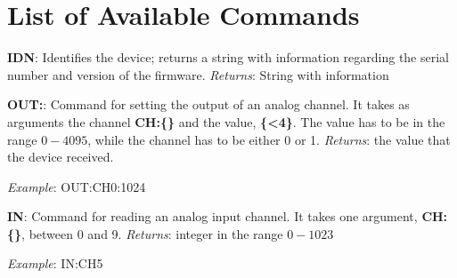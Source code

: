 \section{List of Available Commands}\label{sec:list-of-commandsavailable}
\textbf{{IDN}}: Identifies the device; returns a string with information regarding the serial number and version of the firmware. \emph{Returns}: String with information

\textbf{{OUT}:}: Command for setting the output of an analog channel. It takes as arguments the channel \textbf{{CH}:\{\}} and the value, \textbf{\{\textless{}4\}}. The value has to be in the range $0-4095$, while the channel has to be either 0 or 1. \emph{Returns}: the value that the device received.

\emph{Example}: {OUT}:{CH0}:1024

\textbf{{IN}}: Command for reading an analog input channel. It takes one argument, \textbf{{CH}:\{\}}, between 0 and 9. \emph{Returns}: integer in the range $0-1023$

\emph{Example}: {IN}:{CH5}
